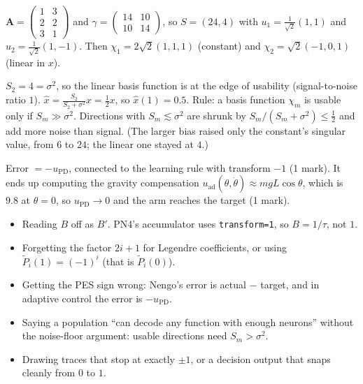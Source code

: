 \documentclass[11pt,letterpaper]{article}
\newcommand{\ans}[1]{\par\vspace{4pt}{\bfseries #1}\quad}
\begin{document}
\ans{4(a)} [2] $\mathbf A = \begin{pmatrix} 1 & 3 \\ 2 & 2 \\ 3 & 1\end{pmatrix}$ and $\gamma = \begin{pmatrix} 14 & 10 \\ 10 & 14\end{pmatrix}$, so $S = (24, 4)$ with $u_1 = \tfrac1{\sqrt2}(1, 1)$ and $u_2 = \tfrac1{\sqrt2}(1, -1)$. Then $\chi_1 = 2\sqrt2(1, 1, 1)$ (constant) and $\chi_2 = \sqrt2(-1, 0, 1)$ (linear in $x$).

\ans{4(b)} [2] $S_2 = 4 = \sigma^2$, so the linear basis function is at the edge of usability (signal-to-noise ratio $1$). $\hat x = \frac{S_2}{S_2 + \sigma^2}x = \frac12 x$, so $\hat x(1) = 0.5$. Rule: a basis function $\chi_m$ is usable only if $S_m \gg \sigma^2$. Directions with $S_m \lesssim \sigma^2$ are shrunk by $S_m/(S_m + \sigma^2) \le \tfrac12$ and add more noise than signal. (The larger bias raised only the constant's singular value, from $6$ to $24$; the linear one stayed at $4$.)

\ans{5} [2] Error $= -u_{\mathrm{PD}}$, connected to the learning rule with transform $-1$ (1 mark). It ends up computing the gravity compensation $u_{\mathrm{ad}}(\theta, \dot\theta) \approx mgL\cos\theta$, which is $9.8$ at $\theta = 0$, so $u_{\mathrm{PD}} \to 0$ and the arm reaches the target (1 mark).

\begin{trap}
\begin{itemize}[leftmargin=1.2em, itemsep=1pt, topsep=1pt]
\item Reading $B$ off as $B'$. PN4's accumulator uses \texttt{transform=1}, so $B = 1/\tau$, not $1$.
\item Forgetting the factor $2i + 1$ for Legendre coefficients, or using $\tilde P_i(1) = (-1)^i$ (that is $\tilde P_i(0)$).
\item Getting the PES sign wrong: Nengo's error is actual $-$ target, and in adaptive control the error is $-u_{\mathrm{PD}}$.
\item Saying a population ``can decode any function with enough neurons'' without the noise-floor argument: usable directions need $S_m > \sigma^2$.
\item Drawing traces that stop at exactly $\pm1$, or a decision output that snaps cleanly from $0$ to $1$.
\end{itemize}
\end{trap}
\end{document}
